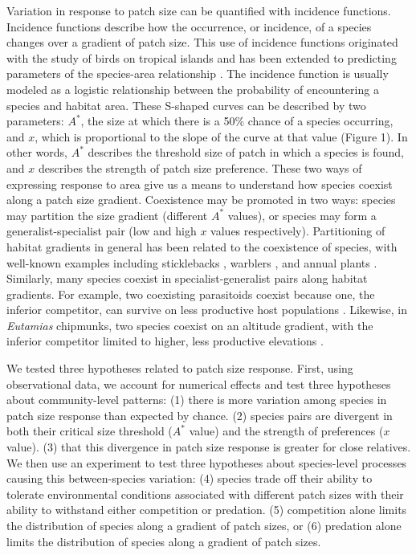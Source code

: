 Variation in response to patch size can be quantified with incidence
functions. Incidence functions describe how the occurrence, or
incidence, of a species changes over a gradient of patch size. This
use of incidence functions originated with the study of birds on
tropical islands \citep{Diamond1986} and has been extended to predicting
parameters of the species-area relationship \citep{Ovaskainen2003}. The
incidence function is usually modeled as a logistic relationship between
the probability of encountering a species and habitat area. These
S-shaped curves can be described by two parameters: \(A^{*}\), the size
at which there is a 50\% chance of a species occurring, and \(x\), which
is proportional to the slope of the curve at that value (Figure 1). In
other words, \(A^{*}\) describes the threshold size of patch in which a
species is found, and \(x\) describes the strength of patch size
preference. These two ways of expressing response to area give us a
means to understand how species coexist along a patch size gradient.
Coexistence may be promoted in two ways: species may partition the size
gradient (different \(A^{*}\) values), or species may form a
generalist-specialist pair (low and high \(x\) values respectively). Partitioning
of habitat gradients in general has been related to the coexistence of
species, with well-known examples including sticklebacks
\citep{Rundle2000}, warblers \citep{MacArthur1958}, and annual plants
\citep{Seabloom2003}. Similarly, many species coexist in
specialist-generalist pairs along habitat gradients. For example, two
coexisting parasitoids coexist because one, the inferior competitor, can
survive on less productive host populations \citep{Amarasekare2000}.
Likewise, in \emph{Eutamias} chipmunks, two species coexist on an
altitude gradient, with the inferior competitor limited to higher, less
productive elevations \citep{Sheppard1971}.

We tested three hypotheses related to patch size response. First, using
observational data, we account for numerical effects and test three
hypotheses about community-level patterns: (1) there is more variation among species
in patch size response than expected by chance. (2) species pairs are divergent in
both their critical size threshold (\(A^{*}\) value) and the strength of
preferences (\(x\) value). (3) that this divergence in patch size
response is greater for close relatives. We then use an experiment to
test three hypotheses about species-level processes causing this between-species variation: (4) species trade off their ability to tolerate
environmental conditions associated with different patch sizes with
their ability to withstand either competition or predation. (5)
competition alone limits the distribution of species along a gradient of
patch sizes, or (6) predation alone limits the distribution of species
along a gradient of patch sizes.

